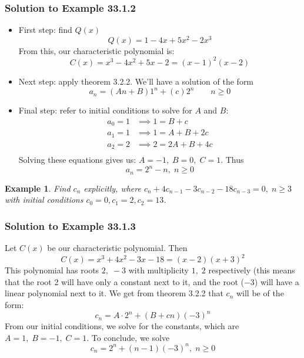 \documentclass{report}
\newtheorem{ex}{Example}[section]
\begin{document}
\subsubsection{Solution to Example 33.1.2}
\begin{itemize}
\item First step: find $Q(x)$ $$Q(x) = 1-4x+5x^2-2x^3$$
From this, our characteristic polynomial is: $$C(x) = x^3 - 4x^2 + 5x - 2 = (x-1)^2(x-2)$$
\item Next step: apply theorem 3.2.2. We'll have a solution of the form
$$a_n = (An+B)1^n + (c)2^n \qquad n \geq 0$$
\item Final step: refer to initial conditions to solve for $A$ and $B$:\\
\begin{align*}
a_0 = 1 &\implies 1 = B + c \\
a_1 = 1 &\implies 1 = A+B + 2c \\
a_2 = 2 &\implies 2 = 2A+B + 4c \\
\end{align*}
Solving these equations gives us: $A = -1,\; B = 0,\; C = 1$. Thus $$a_n = 2^n - n, \; n \geq 0$$
\end{itemize}
\begin{ex}
Find $c_n$ explicitly, where $c_n + 4c_{n-1} - 3c_{n-2} - 18c_{n-3} = 0, \; n \geq 3$ with initial conditions $c_0 = 0, c_1 = 2, c_2 = 13$.
\end{ex}
\subsubsection{Solution to Example 33.1.3}
Let $C(x)$ be our characteristic polynomial. Then
$$C(x) = x^3 + 4x^2 -3x - 18 = (x-2)(x+3)^2$$
This polynomial has roots $2, \; -3$ with multiplicity $1, \; 2$ respectively (this means that the root 2 will have only a constant next to it, and the root ($-3$) will have a linear polynomial next to it. We get from theorem 3.2.2 that $c_n$ will be of the form:
$$c_n = A\cdot 2^n + (B+cn)(-3)^n$$
From our initial conditions, we solve for the constants, which are $A = 1,\; B=-1, \; C=1$. To conclude, we solve
$$c_n = 2^n + (n-1)(-3)^n, \; n \geq 0$$
\end{document}
